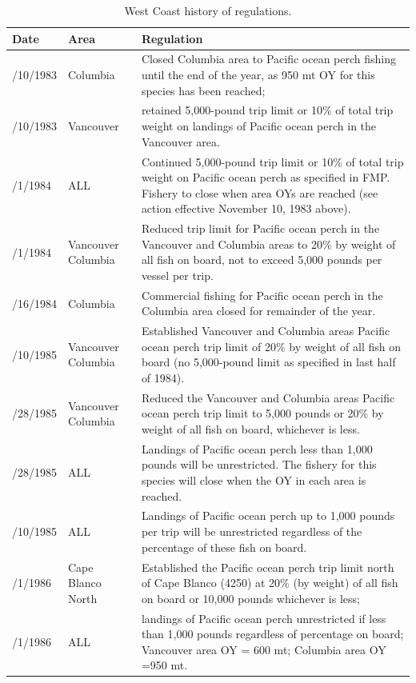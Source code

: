 \documentclass[12pt,]{article}
\begin{document}
\begin{table}[ht]
\centering
\caption{West Coast history of regulations.} 
\label{tab:Regs}
\begingroup\fontsize{9pt}{10pt}\selectfont
\begin{tabular}{>{\centering}p{.60in}>{\centering}p{1.0in}>{\raggedright}p{4.20in}}
  \hline
Date & Area & Regulation \\ 
  \hline
11/10/1983 &  Columbia  &  Closed Columbia area to Pacific ocean perch fishing until the end of the year, as 950 mt OY for this species has been reached;  \\ 
  11/10/1983 &  Vancouver  &  retained 5,000-pound trip limit or 10\% of total trip weight on landings of Pacific ocean perch in the Vancouver area.  \\ 
  1/1/1984 &  ALL  &  Continued 5,000-pound trip limit or 10\% of total trip weight on Pacific ocean perch as specified in FMP. Fishery to close when area OYs are reached (see action effective November 10, 1983 above).  \\ 
  8/1/1984 &  Vancouver Columbia  &  Reduced trip limit for Pacific ocean perch in the Vancouver and Columbia areas to 20\% by weight of all fish on board, not to exceed 5,000 pounds per vessel per trip. \\ 
  8/16/1984 &  Columbia  &  Commercial fishing for Pacific ocean perch in the Columbia area closed for remainder of the year. \\ 
  1/10/1985 &  Vancouver Columbia  &  Established Vancouver and Columbia areas Pacific ocean perch trip limit of 20\% by weight of all fish on board (no 5,000-pound limit as specified in last half of 1984). \\ 
  4/28/1985 &  Vancouver Columbia  &  Reduced the Vancouver and Columbia areas Pacific ocean perch trip limit to 5,000 pounds or 20\% by weight of all fish on board, whichever is less.  \\ 
  4/28/1985 &  ALL  &  Landings of Pacific ocean perch less than 1,000 pounds will be unrestricted. The fishery for this species will close when the OY in each area is reached. \\ 
  6/10/1985 &  ALL  &   Landings of Pacific ocean perch up to 1,000 pounds per trip will be unrestricted regardless of the percentage of these fish on board.  \\ 
  1/1/1986 &  Cape Blanco North  &  Established the Pacific ocean perch trip limit north of Cape Blanco (4250) at 20\% (by weight) of all fish on board or 10,000 pounds whichever is less;  \\ 
  1/1/1986 &  ALL  &  landings of Pacific ocean perch unrestricted if less than 1,000 pounds regardless of percentage on board; Vancouver area OY = 600 mt; Columbia area OY =950 mt.  \\ 

\end{tabular}
\end{table}
\end{document}

